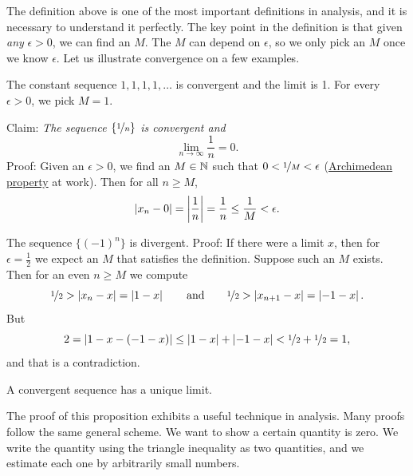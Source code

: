 The definition above is one of the most important definitions in analysis,
and it is necessary to understand it perfectly.  The key point in the
definition is that given \emph{any} $\epsilon > 0$, we can find an $M$.  The
$M$ can depend on $\epsilon$, so we only pick an $M$ once we know
$\epsilon$.  Let us illustrate convergence on a few examples.

\begin{example}
The constant sequence $1,1,1,1,\ldots$ is convergent and the limit is 1.  For
every $\epsilon > 0$, we pick $M = 1$.
\end{example}

\begin{example}
Claim: \emph{The sequence $\{ \nicefrac{1}{n} \}$ is convergent and}
\begin{equation*}
\lim_{n\to \infty} \frac{1}{n} = 0 .
\end{equation*}
Proof: Given an $\epsilon > 0$, we find an $M \in {\mathbb{N}}$ such that
$0 < \nicefrac{1}{M} < \epsilon$
(\hyperref[thm:arch:i]{Archimedean property} at work).
Then for all $n \geq M$,
\begin{equation*}
\left\lvert {x_n - 0} \right\rvert = \left\lvert {\frac{1}{n}} \right\rvert = \frac{1}{n} \leq \frac{1}{M} < \epsilon .
\end{equation*}
\end{example}

\begin{example}
The sequence $\{ {(-1)}^n \}$ is divergent.  Proof: If there
were a limit $x$, then for $\epsilon = \frac{1}{2}$ we expect an $M$ that
satisfies the definition.  Suppose
such an $M$ exists.
Then for an even $n \geq M$ we compute
\begin{equation*}
\nicefrac{1}{2} > \left\lvert {x_n - x} \right\rvert  = \left\lvert {1 - x} \right\rvert
\qquad \text{and} \qquad
\nicefrac{1}{2} > \left\lvert {x_{n+1} - x} \right\rvert  = \left\lvert {-1 - x} \right\rvert .
\end{equation*}
But
\begin{equation*}
2 = \left\lvert {1 - x - (-1 -x)} \right\rvert \leq
\left\lvert {1 - x} \right\rvert + \left\lvert {-1 -x} \right\rvert < \nicefrac{1}{2} + \nicefrac{1}{2} = 1 ,
\end{equation*}
and that is a contradiction.
\end{example}

\begin{prop} \label{prop:limisunique}
A convergent sequence has a unique limit.
\end{prop}

The proof of this proposition exhibits a useful technique in
analysis.  Many proofs follow the same general scheme.  We want to
show a certain quantity is zero.  We write the quantity using the 
triangle inequality as two quantities, and we estimate each one
by arbitrarily small numbers.

